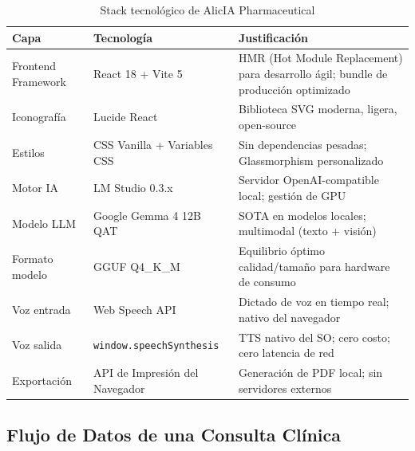 \documentclass[12pt,a4paper]{article}
\begin{document}
\begin{table}[H]
  \centering
  \caption{Stack tecnológico de AlicIA Pharmaceutical}
  \begin{tabularx}{\textwidth}{llX}
    \toprule
    \textbf{Capa} & \textbf{Tecnología} & \textbf{Justificación} \\
    \midrule
    Frontend Framework & React 18 + Vite 5 & HMR (Hot Module Replacement) para desarrollo ágil; bundle de producción optimizado \\
    \midrule
    Iconografía & Lucide React & Biblioteca SVG moderna, ligera, open-source \\
    \midrule
    Estilos & CSS Vanilla + Variables CSS & Sin dependencias pesadas; Glassmorphism personalizado \\
    \midrule
    Motor IA & LM Studio 0.3.x & Servidor OpenAI-compatible local; gestión de GPU \\
    \midrule
    Modelo LLM & Google Gemma 4 12B QAT & SOTA en modelos locales; multimodal (texto + visión) \\
    \midrule
    Formato modelo & GGUF Q4\_K\_M & Equilibrio óptimo calidad/tamaño para hardware de consumo \\
    \midrule
    Voz entrada & Web Speech API & Dictado de voz en tiempo real; nativo del navegador \\
    \midrule
    Voz salida & \texttt{window.speechSynthesis} & TTS nativo del SO; cero costo; cero latencia de red \\
    \midrule
    Exportación & API de Impresión del Navegador & Generación de PDF local; sin servidores externos \\
    \bottomrule
  \end{tabularx}
\end{table}

\subsection{Flujo de Datos de una Consulta Clínica}
\end{document}
